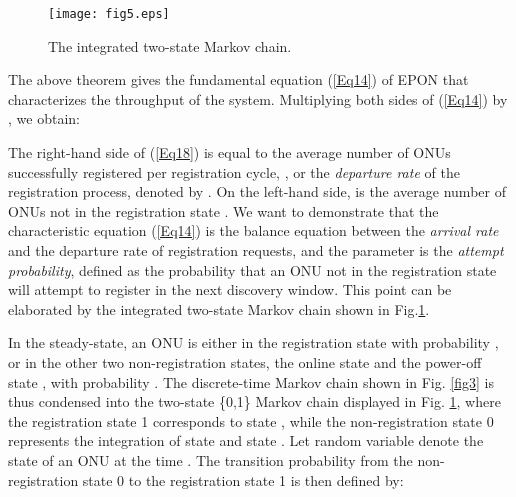 \documentclass[journal]{IEEEtran}
\begin{document}
\begin{figure}[b]
\centering
\texttt{[image: fig5.eps]}
\caption{The integrated two-state Markov chain.}\label{fig5}
\end{figure}

The above theorem gives the fundamental equation (\ref{Eq14}) of EPON that characterizes the throughput of the system. Multiplying both sides of (\ref{Eq14}) by , we obtain:

The right-hand side of (\ref{Eq18}) is equal to the average number of ONUs successfully registered per registration cycle, , or the \emph{departure rate} of the registration process, denoted by . On the left-hand side,  is the average number of ONUs not in the registration state . We want to demonstrate that the characteristic equation (\ref{Eq14}) is the balance equation between the \emph{arrival rate}  and the departure rate of registration requests, and the parameter  is the \emph{attempt probability}, defined as the probability that an ONU not in the registration state will attempt to register in the next discovery window. This point can be elaborated by the integrated two-state Markov chain shown in Fig.\ref{fig5}.


In the steady-state, an ONU is either in the registration state  with probability , or in the other two non-registration states, the online state  and the power-off state , with probability . The discrete-time Markov chain shown in Fig. \ref{fig3} is thus condensed into the two-state \{0,1\} Markov chain displayed in Fig. \ref{fig5}, where the registration state 1 corresponds to state , while the non-registration state 0 represents the integration of state  and state . Let random variable  denote the state of an ONU at the time . The transition probability from the non-registration state 0 to the registration state 1 is then defined by:
\end{document}
